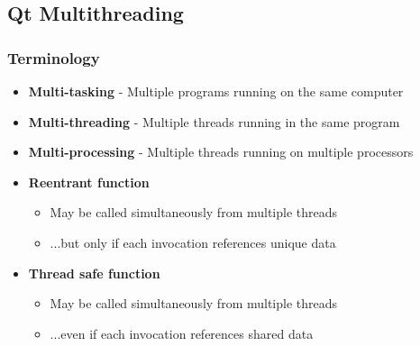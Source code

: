 %
%
%
%

\subsection{Qt Multithreading}


\begin{slide}
\frametitle{Terminology}

\begin{itemize}
\item \textbf{Multi-tasking} - Multiple programs running on the same computer
\item \textbf{Multi-threading} - Multiple threads running in the same program
\item \textbf{Multi-processing} - Multiple threads running on multiple processors
\vspace{1em}
\item \textbf{Reentrant function}
  \begin{itemize}
  \item May be called simultaneously from multiple threads
  \item ...but only if each invocation references unique data
  \end{itemize}
\item \textbf{Thread safe function}
  \begin{itemize}
  \item May be called simultaneously from multiple threads
  \item ...even if each invocation references shared data
  \end{itemize}
\end{itemize}

\end{slide}

